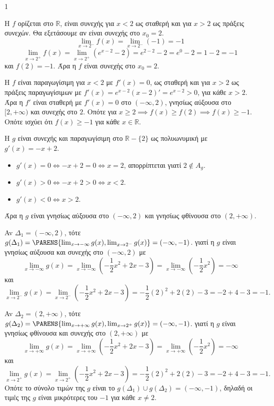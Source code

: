 \begin{ylh}{1}
    \item [Ύλη από εικόνα]
\end{ylh}
\begin{alist}
\item Η $f$ ορίζεται στο $\mathbb{R}$, είναι συνεχής για $x<2$ ως σταθερή και για $x>2$ ως πράξεις συνεχών. Θα εξετάσουμε αν είναι συνεχής στο $x_0=2$.
\[ \lim_{x \to 2^-} f(x) = \lim_{x \to 2^-} (-1) = -1 \]
\[ \lim_{x \to 2^+} f(x) = \lim_{x \to 2^+} (e^{x-2}-2) = e^{2-2}-2 = e^0-2 = 1-2 = -1 \]
και $f(2) = -1$.
Άρα η $f$ είναι συνεχής στο $x_0=2$.

Η $f$ είναι παραγωγίσιμη για $x<2$ με $f'(x)=0$, ως σταθερή και για $x>2$ ως πράξεις παραγωγίσιμων με $f'(x) = e^{x-2}(x-2)' = e^{x-2} > 0$, για κάθε $x>2$.
Άρα η $f'$ είναι σταθερή με $f'(x)=0$ στο $(-\infty,2)$, γνησίως αύξουσα στο $[2,+\infty)$ και συνεχής στο $2$. Οπότε για $x \ge 2 \implies f(x) \ge f(2) \implies f(x) \ge -1$.
Οπότε ισχύει ότι $f(x) \ge -1$ για κάθε $x \in \mathbb{R}$.

Η $g$ είναι συνεχής και παραγωγίσιμη στο $\mathbb{R}-\{2\}$ ως πολυωνυμική με $g'(x) = -x+2$.
\begin{itemize}
    \item $g'(x)=0 \iff -x+2=0 \iff x=2$, απορρίπτεται γιατί $2 \notin A_g$.
    \item $g'(x)>0 \iff -x+2>0 \iff x<2$.
    \item $g'(x)<0 \iff x>2$.
\end{itemize}
Άρα η $g$ είναι γνησίως αύξουσα στο $(-\infty,2)$ και γνησίως φθίνουσα στο $(2,+\infty)$.

Av $\Delta_1 = (-\infty,2)$, τότε $g(\Delta_1) = \PARENS{\lim_{x \to -\infty} g(x), \lim_{x \to 2^-} g(x)} = (-\infty,-1)$.
γιατί η $g$ είναι γνησίως αύξουσα και συνεχής στο $(-\infty,2)$ με
\[ \lim_{x \to -\infty} g(x) = \lim_{x \to -\infty} \left(-\frac{1}{2} x^2+2x-3\right) = \lim_{x \to -\infty} \left(-\frac{1}{2} x^2\right) = -\infty \]
και
\[ \lim_{x \to 2^-} g(x) = \lim_{x \to 2^-} \left(-\frac{1}{2} x^2+2x-3\right) = -\frac{1}{2}(2)^2+2(2)-3 = -2+4-3 = -1. \]

Av $\Delta_2 = (2,+\infty)$, τότε $g(\Delta_2) = \PARENS{\lim_{x \to +\infty} g(x), \lim_{x \to 2^+} g(x)} = (-\infty,-1)$.
γιατί η $g$ είναι γνησίως φθίνουσα και συνεχής στο $(2,+\infty)$ με
\[ \lim_{x \to +\infty} g(x) = \lim_{x \to +\infty} \left(-\frac{1}{2} x^2+2x-3\right) = \lim_{x \to +\infty} \left(-\frac{1}{2} x^2\right) = -\infty \]
και
\[ \lim_{x \to 2^+} g(x) = \lim_{x \to 2^+} \left(-\frac{1}{2} x^2+2x-3\right) = -\frac{1}{2}(2)^2+2(2)-3 = -2+4-3 = -1. \]
Οπότε το σύνολο τιμών της $g$ είναι το $g(\Delta_1) \cup g(\Delta_2) = (-\infty,-1)$, δηλαδή οι τιμές της $g$ είναι μικρότερες του $-1$ για κάθε $x \neq 2$.


\end{alist}
